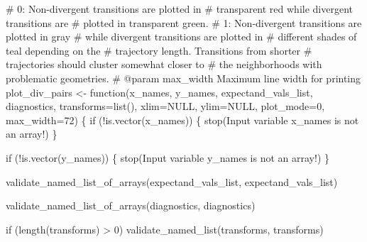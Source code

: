 \documentclass[
  letterpaper,
  DIV=11,
  numbers=noendperiod]{scrartcl}
\newenvironment{Shaded}{\begin{snugshade}}{\end{snugshade}}
\newcommand{\BuiltInTok}[1]{\textcolor[rgb]{0.00,0.23,0.31}{#1}}
\newcommand{\CommentTok}[1]{\textcolor[rgb]{0.37,0.37,0.37}{#1}}
\newcommand{\ControlFlowTok}[1]{\textcolor[rgb]{0.00,0.23,0.31}{#1}}
\newcommand{\DecValTok}[1]{\textcolor[rgb]{0.68,0.00,0.00}{#1}}
\newcommand{\KeywordTok}[1]{\textcolor[rgb]{0.00,0.23,0.31}{#1}}
\newcommand{\NormalTok}[1]{\textcolor[rgb]{0.00,0.23,0.31}{#1}}
\newcommand{\OperatorTok}[1]{\textcolor[rgb]{0.37,0.37,0.37}{#1}}
\newcommand{\StringTok}[1]{\textcolor[rgb]{0.13,0.47,0.30}{#1}}
\begin{document}
\begin{Shaded}
\begin{Highlighting}[]
\CommentTok{\#                     0: Non{-}divergent transitions are plotted in }
\CommentTok{\#                        transparent red while divergent transitions are}
\CommentTok{\#                        plotted in transparent green.}
\CommentTok{\#                     1: Non{-}divergent transitions are plotted in gray }
\CommentTok{\#                        while divergent transitions are plotted in }
\CommentTok{\#                        different shades of teal depending on the }
\CommentTok{\#                        trajectory length.  Transitions from shorter}
\CommentTok{\#                        trajectories should cluster somewhat closer to }
\CommentTok{\#                        the neighborhoods with problematic geometries.}
\CommentTok{\# @param max\_width Maximum line width for printing}
\NormalTok{plot\_div\_pairs }\OperatorTok{\textless{}{-}}\NormalTok{ function(x\_names, y\_names, }
\NormalTok{                           expectand\_vals\_list, diagnostics,}
\NormalTok{                           transforms}\OperatorTok{=}\BuiltInTok{list}\NormalTok{(), xlim}\OperatorTok{=}\NormalTok{NULL, ylim}\OperatorTok{=}\NormalTok{NULL,}
\NormalTok{                           plot\_mode}\OperatorTok{=}\DecValTok{0}\NormalTok{, max\_width}\OperatorTok{=}\DecValTok{72}\NormalTok{) \{}
  \ControlFlowTok{if}\NormalTok{ (}\OperatorTok{!}\KeywordTok{is}\NormalTok{.vector(x\_names)) \{}
\NormalTok{    stop(}\StringTok{\textquotesingle{}Input variable \textasciigrave{}x\_names\textasciigrave{} is not an array!\textquotesingle{}}\NormalTok{)}
\NormalTok{  \}}
  
  \ControlFlowTok{if}\NormalTok{ (}\OperatorTok{!}\KeywordTok{is}\NormalTok{.vector(y\_names)) \{}
\NormalTok{    stop(}\StringTok{\textquotesingle{}Input variable \textasciigrave{}y\_names\textasciigrave{} is not an array!\textquotesingle{}}\NormalTok{)}
\NormalTok{  \}}
  
\NormalTok{  validate\_named\_list\_of\_arrays(expectand\_vals\_list,}
                                \StringTok{\textquotesingle{}expectand\_vals\_list\textquotesingle{}}\NormalTok{)}

\NormalTok{  validate\_named\_list\_of\_arrays(diagnostics, }\StringTok{\textquotesingle{}diagnostics\textquotesingle{}}\NormalTok{)}

  \ControlFlowTok{if}\NormalTok{ (length(transforms) }\OperatorTok{\textgreater{}} \DecValTok{0}\NormalTok{)}
\NormalTok{    validate\_named\_list(transforms, }\StringTok{\textquotesingle{}transforms\textquotesingle{}}\NormalTok{)}
  

\end{Highlighting}
\end{Shaded}
\end{document}
